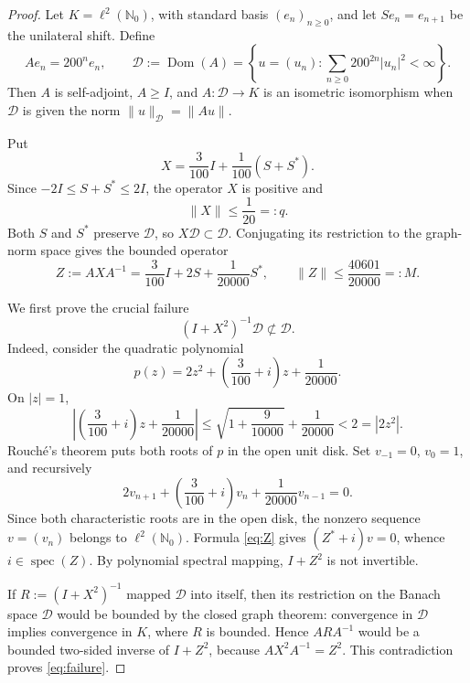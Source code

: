 \documentclass[11pt]{article}
\newcommand{\cD}{\mathcal D}
\newcommand{\Dom}{\operatorname{Dom}}
\newcommand{\spec}{\operatorname{spec}}
\begin{document}
\begin{proof}
Let $K=\ell^2(\mathbb N_0)$, with standard basis $(e_n)_{n\ge0}$, and let
$S e_n=e_{n+1}$ be the unilateral shift.  Define
\[
 A e_n=200^n e_n,
 \qquad
 \cD:=\Dom(A)
 =\left\{u=(u_n):\sum_{n\ge0}200^{2n}|u_n|^2<\infty\right\}.
\]
Then $A$ is self-adjoint, $A\ge I$, and $A:\cD\to K$ is an isometric
isomorphism when $\cD$ is given the norm $\|u\|_{\cD}=\|Au\|$.

Put
\begin{equation}\label{eq:X}
 X=\frac3{100}I+\frac1{100}(S+S^*).
\end{equation}
Since $-2I\le S+S^*\le2I$, the operator $X$ is positive and
\begin{equation}\label{eq:q}
 \|X\|\le\frac1{20}=:q.
\end{equation}
Both $S$ and $S^*$ preserve $\cD$, so $X\cD\subset\cD$.  Conjugating its
restriction to the graph-norm space gives the bounded operator
\begin{equation}\label{eq:Z}
 Z:=AXA^{-1}
 =\frac3{100}I+2S+\frac1{20000}S^*,
 \qquad
 \|Z\|\le\frac{40601}{20000}=:M.
\end{equation}

We first prove the crucial failure
\begin{equation}\label{eq:failure}
 (I+X^2)^{-1}\cD\not\subset\cD.
\end{equation}
Indeed, consider the quadratic polynomial
\[
 p(z)=2z^2+\left(\frac3{100}+i\right)z+\frac1{20000}.
\]
On $|z|=1$,
\[
 \left|\left(\frac3{100}+i\right)z+\frac1{20000}\right|
 \le \sqrt{1+\frac9{10000}}+\frac1{20000}<2=|2z^2|.
\]
Rouch\'e's theorem puts both roots of $p$ in the open unit disk.  Set
$v_{-1}=0$, $v_0=1$, and recursively
\[
 2v_{n+1}+\left(\frac3{100}+i\right)v_n
   +\frac1{20000}v_{n-1}=0.
\]
Since both characteristic roots are in the open disk, the nonzero sequence
$v=(v_n)$ belongs to $\ell^2(\mathbb N_0)$.  Formula \eqref{eq:Z} gives
$(Z^*+i)v=0$, whence $i\in\spec(Z)$.  By polynomial spectral mapping,
$I+Z^2$ is not invertible.

If $R:=(I+X^2)^{-1}$ mapped $\cD$ into itself, then its restriction on the
Banach space $\cD$ would be bounded by the closed graph theorem: convergence
in $\cD$ implies convergence in $K$, where $R$ is bounded.  Hence
$ARA^{-1}$ would be a bounded two-sided inverse of $I+Z^2$, because
$AX^2A^{-1}=Z^2$.  This contradiction proves \eqref{eq:failure}.


\end{proof}
\end{document}

